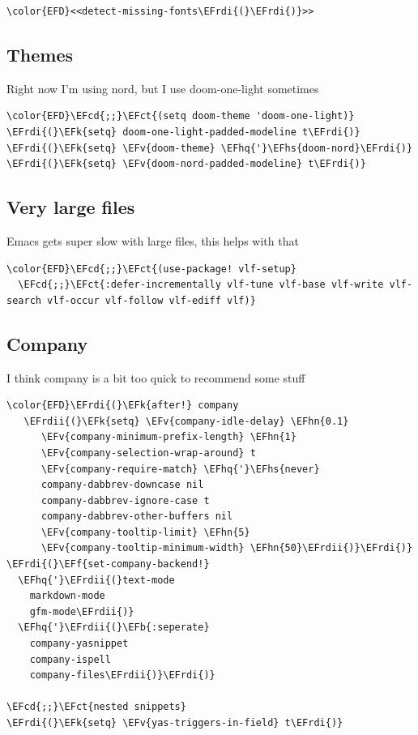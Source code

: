 \documentclass{scrartcl}
\newcommand{\EFk}[1]{\textcolor{EFk}{#1}} %
\newcommand{\EFb}[1]{\textcolor{EFb}{#1}} %
\newcommand{\EFct}[1]{\textcolor{EFct}{#1}} %
\newcommand{\EFv}[1]{\textcolor{EFv}{#1}} %
\newcommand{\EFf}[1]{\textcolor{EFf}{#1}} %
\newcommand{\EFcd}[1]{\textcolor{EFcd}{#1}} %
\newcommand{\EFhn}[1]{#1} %
\newcommand{\EFhq}[1]{#1} %
\newcommand{\EFhs}[1]{#1} %
\newcommand{\EFrdi}[1]{#1} %
\newcommand{\EFrdii}[1]{#1} %
\begin{document}
\begin{Code}
\begin{Verbatim}[]
\color{EFD}<<detect-missing-fonts\EFrdi{(}\EFrdi{)}>>
\end{Verbatim}
\end{Code}

\subsection{Themes}
\label{sec:org0a02302}
Right now I'm using nord, but I use doom-one-light sometimes
\begin{Code}
\begin{Verbatim}[]
\color{EFD}\EFcd{;;}\EFct{(setq doom-theme 'doom-one-light)}
\EFrdi{(}\EFk{setq} doom-one-light-padded-modeline t\EFrdi{)}
\EFrdi{(}\EFk{setq} \EFv{doom-theme} \EFhq{'}\EFhs{doom-nord}\EFrdi{)}
\EFrdi{(}\EFk{setq} \EFv{doom-nord-padded-modeline} t\EFrdi{)}
\end{Verbatim}
\end{Code}

\subsection{Very large files}
\label{sec:org3114e04}
Emacs gets super slow with large files, this helps with that
\begin{Code}
\begin{Verbatim}[]
\color{EFD}\EFcd{;;}\EFct{(use-package! vlf-setup}
  \EFcd{;;}\EFct{:defer-incrementally vlf-tune vlf-base vlf-write vlf-search vlf-occur vlf-follow vlf-ediff vlf)}
\end{Verbatim}
\end{Code}

\subsection{Company}
\label{sec:org1e626f0}
I think company is a bit too quick to recommend some stuff
\begin{Code}
\begin{Verbatim}[]
\color{EFD}\EFrdi{(}\EFk{after!} company
   \EFrdii{(}\EFk{setq} \EFv{company-idle-delay} \EFhn{0.1}
      \EFv{company-minimum-prefix-length} \EFhn{1}
      \EFv{company-selection-wrap-around} t
      \EFv{company-require-match} \EFhq{'}\EFhs{never}
      company-dabbrev-downcase nil
      company-dabbrev-ignore-case t
      company-dabbrev-other-buffers nil
      \EFv{company-tooltip-limit} \EFhn{5}
      \EFv{company-tooltip-minimum-width} \EFhn{50}\EFrdii{)}\EFrdi{)}
\EFrdi{(}\EFf{set-company-backend!}
  \EFhq{'}\EFrdii{(}text-mode
    markdown-mode
    gfm-mode\EFrdii{)}
  \EFhq{'}\EFrdii{(}\EFb{:seperate}
    company-yasnippet
    company-ispell
    company-files\EFrdii{)}\EFrdi{)}

\EFcd{;;}\EFct{nested snippets}
\EFrdi{(}\EFk{setq} \EFv{yas-triggers-in-field} t\EFrdi{)}
\end{Verbatim}
\end{Code}
\end{document}
